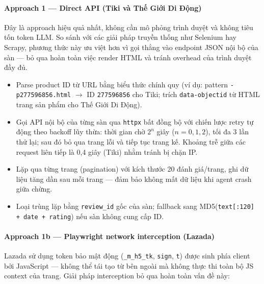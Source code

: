 \paragraph{Approach 1 --- Direct API (Tiki và Thế Giới Di Động)}

Đây là approach hiệu quả nhất, không cần mô phỏng trình duyệt và không tiêu tốn token LLM. So sánh với các giải pháp truyền thống như Selenium hay Scrapy, phương thức này ưu việt hơn vì gọi thẳng vào endpoint JSON nội bộ của sàn --- bỏ qua hoàn toàn việc render HTML và tránh overhead của trình duyệt đầy đủ.

\begin{itemize}[labelsep=10pt, leftmargin=2cm]
    \item Parse product ID từ URL bằng biểu thức chính quy (ví dụ: pattern \texttt{-p277596856.html} $\to$ ID \texttt{277596856} cho Tiki; trích \texttt{data-objectid} từ HTML trang sản phẩm cho Thế Giới Di Động).
    \item Gọi API nội bộ của từng sàn qua \texttt{httpx} bất đồng bộ với chiến lược retry tự động theo backoff lũy thừa: thời gian chờ $2^n$ giây ($n = 0, 1, 2$), tối đa 3 lần thử lại; sau đó bỏ qua trang lỗi và tiếp tục trang kế. Khoảng trễ giữa các request liên tiếp là 0,4 giây (Tiki) nhằm tránh bị chặn IP.
    \item Lặp qua từng trang (pagination) với kích thước 20 đánh giá/trang, ghi dữ liệu tăng dần sau mỗi trang --- đảm bảo không mất dữ liệu khi agent crash giữa chừng.
    \item Loại trùng lặp bằng \texttt{review\_id} gốc của sàn; fallback sang MD5(\texttt{text[:120] + date + rating}) nếu sàn không cung cấp ID.
\end{itemize}

\paragraph{Approach 1b --- Playwright network interception (Lazada)}

Lazada sử dụng token bảo mật động (\texttt{\_m\_h5\_tk}, \texttt{sign}, \texttt{t}) được sinh phía client bởi JavaScript --- không thể tái tạo từ bên ngoài mà không thực thi toàn bộ JS context của trang. Giải pháp interception bỏ qua hoàn toàn vấn đề này:


